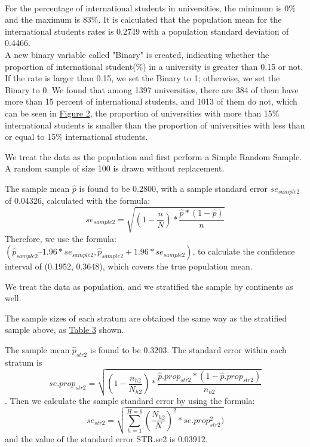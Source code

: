 \documentclass{article}
\begin{document}
\\

 For the percentage of international students in universities, the minimum is 0\% and the maximum is 83\%. It is calculated that the population mean for the international students rates is 0.2749 with a population standard deviation of 0.4466.\\

 A new binary variable called "Binary" is created, indicating whether the proportion of international student(\%) in a university is greater than 0.15 or not. If the rate is larger than 0.15, we set the Binary to 1; otherwise, we set the Binary to 0. We found that among 1397 universities, there are 384 of them have more than 15 percent of international students, and 1013 of them do not, which can be seen in {\hyperref[fig:test2]{Figure 2}}, the proportion of universities with more than 15\% international students is smaller than the proportion of universities with less than or equal to 15\% international students.\\


We treat the data as the population and first perform a Simple Random Sample. A random sample of size 100 is drawn without replacement.

The sample mean $\hat{p}$ is found to be 0.2800, with a sample standard error $se_{sample2}$ of 0.04326, calculated with the formula:
$$se_{sample2} = \sqrt{(1-\frac{n}{N})*\frac{\hat{p}*(1-\hat{p})}{n}}$$
Therefore, we use the formula: $(\hat{p}_{sample2} – 1.96 * se_{sample2}, \hat{p}_{sample2} + 1.96 * se_{sample2})$, to calculate the confidence interval of (0.1952, 0.3648), which covers the true population mean.\\


We treat the data as population, and we stratified the sample by continents as well. 

The sample sizes of each stratum are obtained the same way as the stratified sample above, as {\hyperref[tab:(c)]{Table 3}} shown.

The sample mean $\hat{p}_{str2}$ is found to be 0.3203. The standard error within each stratum is 
$$se.prop_{str2} = \sqrt{(1-\frac{n_{h2}}{N_{h2}})* \frac{\hat{p}.prop_{str2}*(1-\hat{p}.prop_{str2})}{n_{h2}}}$$.  Then we calculate the sample standard error by using the formula:
$$se_{str2} = \sqrt{\sum_{h=1}^{H=6}(\frac{N_{h2}}{N})^2 * se.prop_{str2}^2)}$$ and the value of the standard error STR.se2 is 0.03912. 
\end{document}
